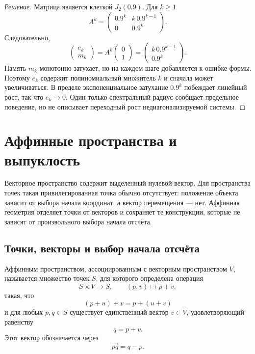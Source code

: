\begin{proof}[Решение]
Матрица является клеткой $J_2(0.9)$. Для $k\geq1$
\[
A^k
=
\begin{pmatrix}
0.9^k&k\,0.9^{k-1}\\
0&0.9^k
\end{pmatrix}.
\]
Следовательно,
\[
\begin{pmatrix}e_k\\m_k\end{pmatrix}
=A^k
\begin{pmatrix}0\\1\end{pmatrix}
=
\begin{pmatrix}
k\,0.9^{k-1}\\0.9^k
\end{pmatrix}.
\]
Память $m_k$ монотонно затухает, но на каждом шаге добавляется к ошибке формы. Поэтому $e_k$ содержит полиномиальный множитель $k$ и сначала может увеличиваться. В пределе экспоненциальное затухание $0.9^k$ побеждает линейный рост, так что $e_k\to0$. Один только спектральный радиус сообщает предельное поведение, но не описывает переходный рост недиагонализируемой системы.
\end{proof}

\section{Аффинные пространства и выпуклость}
\label{sec:affine-convex}

Векторное пространство содержит выделенный нулевой вектор. Для пространства точек такая привилегированная точка обычно отсутствует: положение объекта зависит от выбора начала координат, а вектор перемещения --- нет. Аффинная геометрия отделяет точки от векторов и сохраняет те конструкции, которые не зависят от произвольного выбора начала отсчёта.

\subsection{Точки, векторы и выбор начала отсчёта}

\begin{definition}
Аффинным пространством, ассоциированным с векторным пространством \(V\), называется множество точек \(S\), для которого определена операция
\[
S\times V\to S,
\qquad
(p,v)\mapsto p+v,
\]
такая, что
\[
(p+u)+v=p+(u+v)
\]
и для любых \(p,q\in S\) существует единственный вектор \(v\in V\), удовлетворяющий равенству
\[
q=p+v.
\]
Этот вектор обозначается через
\[
\overrightarrow{pq}=q-p.
\]
\end{definition}

